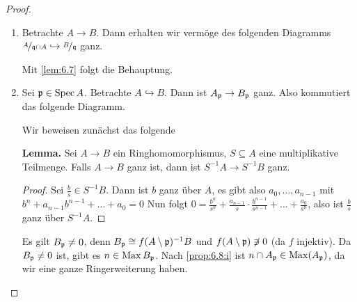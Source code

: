 \documentclass[12pt,a4paper]{scrartcl}
\theoremstyle{cplain}
\theoremstyle{cdef}
\begin{document}
\begin{proof}
	\leavevmode
	\begin{enumerate}[label=\ref{prop:6.8:\roman*}]
		\item Betrachte $A\to B$. Dann erhalten wir vermöge des folgenden Diagramms $\nicefrac{A}{\mathfrak{q}\cap A}\hookrightarrow \nicefrac{B}{\mathfrak{q}}$ ganz.
		\begin{center}
		\end{center}
		Mit \cref{lem:6.7} folgt die Behauptung.
		\item Sei $\mathfrak{p}\in\operatorname{Spec} A$. Betrachte $A\hookrightarrow B$. Dann ist $A_{\mathfrak{p}}\to B_{\mathfrak{p}}$ ganz. Also kommutiert das folgende Diagramm.
		\begin{center}
			\end{center}

		Wir beweisen zunächst das folgende
		
		\textbf{Lemma.} Sei $A\to B$ ein Ringhomomorphismus, $S\subseteq A$ eine multiplikative Teilmenge. Falls $A\to B$ ganz ist, dann ist $S^{-1}A\to S^{-1}B$ ganz.
		\begin{proof}
			Sei $\frac{b}{s}\in S^{-1}B$. Dann ist $b$ ganz über $A$, es gibt also $a_0,\dots, a_{n-1}$ mit $b^n + a_{n-1}b^{n-1}+\dots + a_0 = 0$ Nun folgt $0 = \frac{b^n}{s^n}+\frac{a_{n-1}}{s}\cdot \frac{b^{n-1}}{s^{n-1}}+\dots+\frac {a_0}{s^n}$, also ist $\frac bs$ ganz über $S^{-1}A$.
		\end{proof}
		
		Es gilt $B_{\mathfrak{p}} \neq 0$, denn $B_{\mathfrak{p}}\cong f(A\setminus \mathfrak{p})^{-1}B$ und $f(A\setminus \mathfrak{p})\not \ni 0$ (da $f$ injektiv). Da $B_{\mathfrak{p}}\neq 0$ ist, gibt es $n\in \operatorname{Max} B_{\mathfrak{p}}$. Nach \ref{prop:6.8:i} ist $n\cap A_{\mathfrak{p}} \in \operatorname{Max}(A_{\mathfrak{p}})$, da wir eine ganze Ringerweiterung haben.
		

\end{enumerate}
\end{proof}
\end{document}
